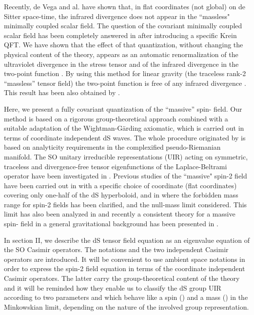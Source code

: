 \documentclass[a4paper,11pt,showpacs,preprintnumbers]{revtex4}
\begin{document}
Recently, de Vega and al. \cite{vera} have shown that,  in flat
coordinates (not global)  on de Sitter space-time, the infrared
divergence does not appear in the ``massless" minimally coupled
scalar field. The question  of the covariant minimally coupled
scalar field has been completely answered in \cite{gareta1} after
introducing a specific Krein QFT. We have shown that the effect of
that quantization, without changing the physical content of the
theory, appears as an automatic renormalization of the ultraviolet
divergence in the stress tensor and of the infrared divergence in
the two-point function \cite{ta4}. By using this method for linear
gravity (the traceless rank-2 ``massless'' tensor field) the
two-point function is free of any infrared divergence \cite{ta}.
This result has been also obtained by \cite{hahetu, hiko1, hiko2}.

Here, we present a fully covariant quantization of the ``massive''
spin-\coordHE{} field. Our method is based on a rigorous
group-theoretical approach combined with a suitable adaptation of
the Wightman-G\"arding axiomatic, which is carried out in terms of
coordinate independent dS waves. The whole procedure originated by
\cite{brgamo} is based on analyticity requirements in the
complexified pseudo-Riemanian manifold. The SO\coordHE{} unitary
irreducible representations (UIR) acting on symmetric, traceless
and divergence-free tensor eigenfunctions of the Laplace-Beltrami
operator have been investigated in \cite{higu1}. Previous studies
of the ``massive" spin-2 field have been carried out in
\cite{gasp} with a specific choice of coordinate (flat
coordinates) covering only one-half of the dS hyperboloid, and in
\cite{higu2} where the forbidden mass range for spin-2 fields has
been clarified, and the null-mass limit considered. This limit has
also been analyzed in \cite{papa} and recently a consistent theory
for a massive spin-\coordHE{} field in a general gravitational background
has been presented in \cite{bu}.

In section II, we describe the dS tensor field equation as an
eigenvalue equation of the SO\coordHE{} Casimir operators. The
notations and the two independent Casimir operators are
introduced. It will be convenient to use ambient space notations
in order to express the spin-2 field equation in terms of the
coordinate independent Casimir operators. The latter carry the
group-theoretical content of the theory and it will be reminded
how they enable us to classify the dS group UIR \cite{dix,tak}
according to two parameters \coordHE{} and \coordHE{} which behave like a spin
(\coordHE{}) and a mass (\coordHE{}) in the Minkowskian limit, depending on the
nature of the involved group representation.
\end{document}
